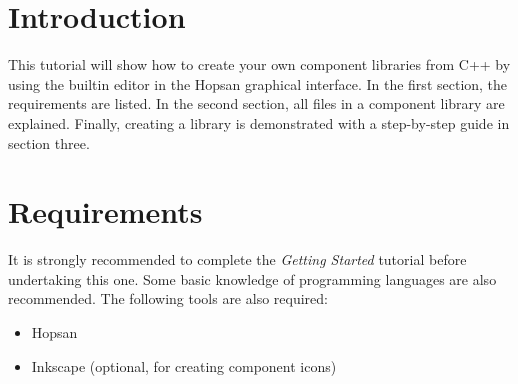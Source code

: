 \documentclass[a4paper,pdftex]{article}
\begin{document}

\section*{Introduction}
This tutorial will show how to create your own component libraries from C++ by using the builtin editor in the Hopsan graphical interface. In the first section, the requirements are listed. In the second section, all files in a component library are explained. Finally, creating a library is demonstrated with a step-by-step guide in section three.

\section*{Requirements}
It is strongly recommended to complete the \textit{Getting Started} tutorial before undertaking this one. Some basic knowledge of programming languages are also recommended. 
The following tools are also required:
%
\begin{itemize} %
\itemsep -3pt
\item Hopsan
\item Inkscape (optional, for creating component icons)
\end{itemize} %
\end{document}
